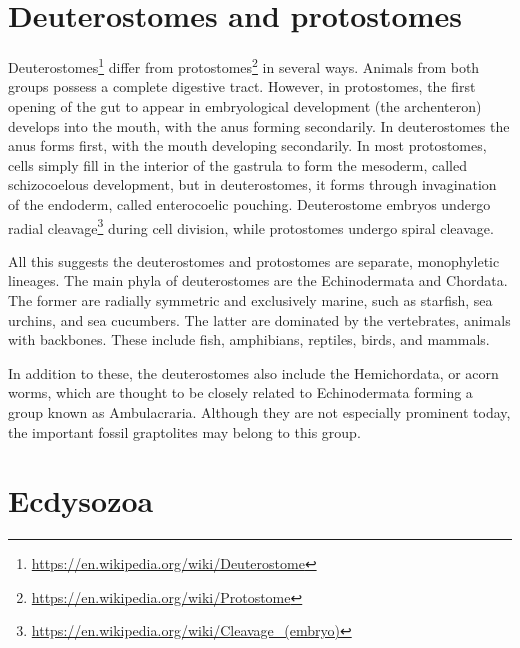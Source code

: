 \documentclass[]{book}
\let\rmarkdownfootnote\footnote%
\def\footnote{\protect\rmarkdownfootnote}
\renewcommand{\href}[2]{#2\footnote{\url{#1}}}
\begin{document}
\hypertarget{deuterostomes-and-protostomes}{%
\section{Deuterostomes and protostomes}\label{deuterostomes-and-protostomes}}

\href{https://en.wikipedia.org/wiki/Deuterostome}{Deuterostomes} differ from \href{https://en.wikipedia.org/wiki/Protostome}{protostomes} in several ways. Animals from both groups possess a complete digestive tract. However, in protostomes, the first opening of the gut to appear in embryological development (the archenteron) develops into the mouth, with the anus forming secondarily. In deuterostomes the anus forms first, with the mouth developing secondarily. In most protostomes, cells simply fill in the interior of the gastrula to form the mesoderm, called schizocoelous development, but in deuterostomes, it forms through invagination of the endoderm, called enterocoelic pouching. Deuterostome embryos undergo radial \href{https://en.wikipedia.org/wiki/Cleavage_(embryo)}{cleavage} during cell division, while protostomes undergo spiral cleavage.

All this suggests the deuterostomes and protostomes are separate, monophyletic lineages. The main phyla of deuterostomes are the Echinodermata and Chordata. The former are radially symmetric and exclusively marine, such as starfish, sea urchins, and sea cucumbers. The latter are dominated by the vertebrates, animals with backbones. These include fish, amphibians, reptiles, birds, and mammals.

In addition to these, the deuterostomes also include the Hemichordata, or acorn worms, which are thought to be closely related to Echinodermata forming a group known as Ambulacraria. Although they are not especially prominent today, the important fossil graptolites may belong to this group.

\hypertarget{ecdysozoa}{%
\section{Ecdysozoa}\label{ecdysozoa}}
\end{document}
